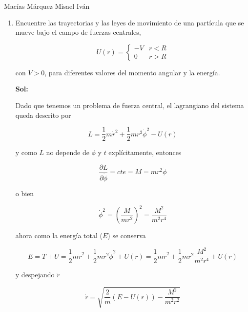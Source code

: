 \documentclass[12pt,a4paper]{article}
\begin{document}
Macías Márquez Misael Iván

\begin{enumerate}






\item Encuentre las trayectorias y las leyes de movimiento de una partícula que se mueve bajo el campo de fuerzas centrales,

\begin{equation*}
    U(r) = \left\{\begin{matrix}
    - V & r<R \\
    0 & r> R
    
    \end{matrix}\right.
\end{equation*}

con $V > 0$, para diferentes valores del momento angular y la energía.

\textbf{Sol:}

Dado que tenemos un problema de fuerza central, el lagrangiano del sistema queda descrito por

\begin{equation*}
    L = \frac{1}{2} m \dot{r}^2 + \frac{1}{2}m r^2 \dot{\phi}^2 - U(r)
\end{equation*}

y como $L$ no depende de $\phi$ y $t$ explícitamente, entonces

\begin{equation*}
    \frac{\partial L}{\partial \dot{\phi}} = cte = M = m r^2 \dot{\phi}
\end{equation*}

o bien

\begin{equation*}
    \dot{\phi}^2 = \left(\frac{M}{mr^2}\right)^2 = \frac{M^2}{m^2 r^4}
\end{equation*}

ahora como la energía total ($E$) se conserva

\begin{equation*}
    E = T + U = \frac{1}{2} m \dot{r}^2 + \frac{1}{2} m r^2 \dot{\phi}^2 + U(r) = \frac{1}{2} m \dot{r}^2 + \frac{1}{2} m r^2 \frac{M^2}{m^2 r^4} + U(r)
\end{equation*}

y despejando $\dot{r}$

\begin{equation*}
    \dot{r} = \sqrt{\frac{2}{m}(E-U(r)) - \frac{M^2}{m^2 r^2}}
\end{equation*}


\end{enumerate}
\end{document}
